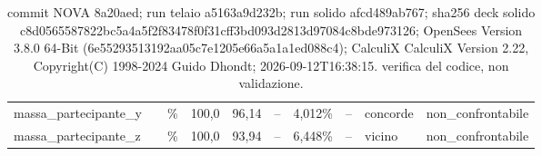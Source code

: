 \begin{table}
\begin{tabular}{lllrrrrrll}
massa\_partecipante\_y &  & \% & 100,0 & 96,14 & -- & 4,012\% & -- & concorde & non\_confrontabile \\
massa\_partecipante\_z &  & \% & 100,0 & 93,94 & -- & 6,448\% & -- & vicino & non\_confrontabile \\
\bottomrule
\end{tabular}
\caption{commit NOVA 8a20aed; run telaio a5163a9d232b; run solido afcd489ab767; sha256 deck solido c8d0565587822bc5a4a5f2f83478f0f31cff3bd093d2813d97084c8bde973126; OpenSees Version 3.8.0 64-Bit (6e55293513192aa05c7e1205e66a5a1a1ed088c4); CalculiX CalculiX Version 2.22, Copyright(C) 1998-2024 Guido Dhondt; 2026-09-12T16:38:15. verifica del codice, non validazione.}
\end{table}
